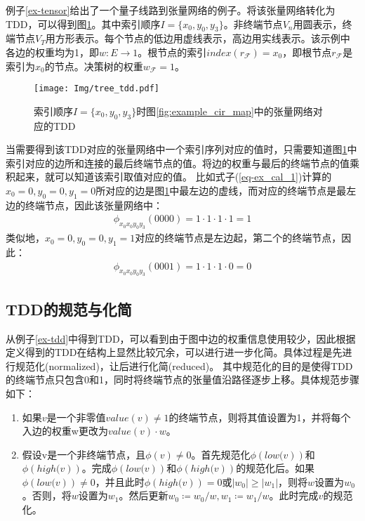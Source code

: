 \begin{example}
    \label{ex-tdd}
    例子\ref{ex-tensor}给出了一个量子线路到张量网络的例子。将该张量网络转化为TDD，可以得到图\ref{fig:tdd_ex}。其中索引顺序$I=\{x_0,y_0,y_3\}$。非终端节点$V_n$用圆表示，终端节点$V_T$用方形表示。每个节点的低边用虚线表示，高边用实线表示。该示例中各边的权重均为1，即$w:E\rightarrow 1$。根节点的索引$index(r_{\mathcal{F}})=x_0$，即根节点\(r_{\mathcal{F}}\)是索引为\(x_0\)的节点。决策树的权重$w_{\mathcal{F}}=1$。

\begin{figure}[!htbp]
    \centering
    \texttt{[image: Img/tree\_tdd.pdf]}
    \caption{索引顺序$I=\{x_0,y_0,y_3\}$时图\ref{fig:example_cir_map}中的张量网络对应的TDD}   
    \label{fig:tdd_ex}
\end{figure}
当需要得到该TDD对应的张量网络中一个索引序列对应的值时，只需要知道图\ref{fig:tdd_ex}中索引对应的边所和连接的最后终端节点的值。将边的权重与最后的终端节点的值乘积起来，就可以知道该索引取值对应的值。
比如式子(\ref{eq-ex_cal_1})计算的\(x_0 = 0, y_0 = 0, y_1 = 0\)所对应的边是图\ref{fig:tdd_ex}中最左边的虚线，而对应的终端节点是最左边的终端节点，因此该张量网络中：
\begin{equation}
    \begin{aligned}
\phi_{x_0x_0y_0y_3}\left(0000\right)
    = 1\cdot 1\cdot 1\cdot 1 = 1
    \end{aligned}
\end{equation}
类似地，\(x_0 = 0, y_0 = 0, y_1 = 1\)对应的终端节点是左边起，第二个的终端节点，因此：
\begin{equation}
    \begin{aligned}
\phi_{x_0x_0y_0y_3}\left(0001\right)
= 1\cdot 1\cdot 1\cdot 0 = 0
    \end{aligned}
\end{equation}
\end{example}
\subsection{TDD的规范与化简}
\label{sec-reduce}
从例子\ref{ex-tdd}中得到TDD，可以看到由于图中边的权重信息使用较少，因此根据定义得到的TDD在结构上显然比较冗余，可以进行进一步化简。具体过程是先进行规范化(normalized)，让后进行化简(reduced)\citep{Hong_2022}。
其中规范化的目的是使得TDD的终端节点只包含0和1，同时将终端节点的张量值沿路径逐步上移。具体规范步骤如下：
\begin{enumerate}
    \item 如果$v$是一个非零值$value\left(v\right)\neq 1$的终端节点，则将其值设置为1，并将每个入边的权重w更改为$value\left(v\right)\cdot w$。\label{norm1}
    \item 假设v是一个非终端节点，且$\phi\left(v\right)\neq 0$。首先规范化$\phi\left.\left(low(v\right)\right)$和$\phi\left.\left(high(v\right)\right)$。完成$\phi\left.\left(low(v\right)\right)$和$\phi\left.\left(high(v\right)\right)$的规范化后。如果$\phi\left.\left(low(v\right)\right)\neq 0$，并且此时$\phi\left.\left(high(v\right)\right)=0$或$\left|w_0\right|\geq\left|w_1\right|$，则将$w$设置为$w_0$。否则，将$w$设置为$w_1$。然后更新$w_0≔w_0/w,w_1≔w_1/w$。此时完成$v$的规范化。\label{norm2}
\end{enumerate}



